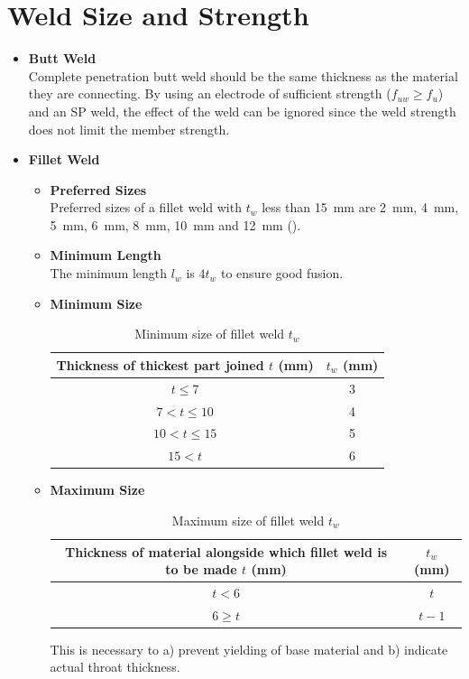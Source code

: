 \section{Weld Size and Strength}
\begin{itemize}
\item \textbf{Butt Weld}\\Complete penetration butt weld should be the same thickness as the material they are connecting. By using an electrode of sufficient strength ($f_{uw}\geqslant{}f_u$) and an SP weld, the effect of the weld can be ignored since the weld strength does not limit the member strength.
\item \textbf{Fillet Weld}
\begin{itemize}
\item \textbf{Preferred Sizes}\\Preferred sizes of a fillet weld with $t_w$ less than \SI{15}{\mm} are \SI{2}{\mm}, \SI{4}{\mm}, \SI{5}{\mm}, \SI{6}{\mm}, \SI{8}{\mm}, \SI{10}{\mm} and \SI{12}{\mm} ().
\item \textbf{Minimum Length}\\The minimum length $l_w$ is $4t_w$ to ensure good fusion.
\item \textbf{Minimum Size}
\begin{table}[H]
\centering\footnotesize\caption{Minimum size of fillet weld $t_w$}
\begin{tabular}{cc}
	\toprule
	Thickness of thickest part joined $t$ (\si{\mm}) & $t_w$ (\si{\mm}) \\ \midrule
	                 $t\leqslant7$                   &     \num{3}      \\
	                $7<t\leqslant10$                 &     \num{4}      \\
	               $10<t\leqslant15$                 &     \num{5}      \\
	                     $15<t$                      &     \num{6}      \\ \bottomrule
\end{tabular}
\end{table}
\item \textbf{Maximum Size}
\begin{table}[H]
\centering\footnotesize\caption{Maximum size of fillet weld $t_w$}
\begin{tabular}{cc}
	\toprule
	Thickness of material alongside which fillet weld is to be made $t$ (\si{\mm}) & $t_w$ (\si{\mm}) \\ \midrule
	                                    $t<6$                                      &       $t$        \\
	                               $6\geqslant{}t$                                 &      $t-1$       \\ \bottomrule
\end{tabular}
\end{table}
This is necessary to a) prevent yielding of base material and b) indicate actual throat thickness.
\end{itemize}
\end{itemize}

